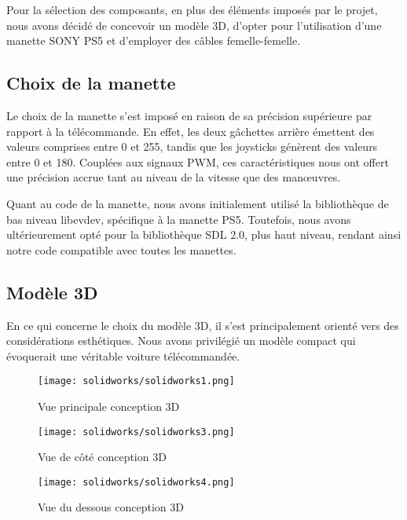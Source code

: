 Pour la sélection des composants, en plus des éléments imposés par le projet, nous avons décidé de concevoir un modèle 3D, d'opter pour l'utilisation d'une manette SONY PS5 et d'employer des câbles femelle-femelle.

\subsection{Choix de la manette}
Le choix de la manette s'est imposé en raison de sa précision supérieure par rapport à la télécommande. En effet, les deux gâchettes arrière émettent des valeurs comprises entre 0 et 255, tandis que les joysticks génèrent des valeurs entre 0 et 180. Couplées aux signaux PWM, ces caractéristiques nous ont offert une précision accrue tant au niveau de la vitesse que des manœuvres.

Quant au code de la manette, nous avons initialement utilisé la bibliothèque de bas niveau libevdev, spécifique à la manette PS5. Toutefois, nous avons ultérieurement opté pour la bibliothèque SDL 2.0, plus haut niveau, rendant ainsi notre code compatible avec toutes les manettes.

\subsection{Modèle 3D}
En ce qui concerne le choix du modèle 3D, il s'est principalement orienté vers des considérations esthétiques. Nous avons privilégié un modèle compact qui évoquerait une véritable voiture télécommandée.

\begin{figure}[h]
    \centering
    \texttt{[image: solidworks/solidworks1.png]}
    \caption{Vue principale conception 3D}
    \label{fig:Vue principale conception 3D}
\end{figure}

\begin{figure}[h]
    \centering
    \texttt{[image: solidworks/solidworks3.png]}
    \caption{Vue de côté conception 3D}
    \label{fig:Vue de côté conception 3D}
\end{figure}

\begin{figure}[h]
    \centering
    \texttt{[image: solidworks/solidworks4.png]}
    \caption{Vue du dessous conception 3D}
    \label{fig:Vue du dessous conception 3D}
\end{figure}

\newpage